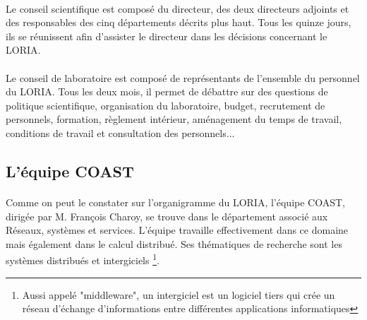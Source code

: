 \documentclass[12pt]{article}
\begin{document}
\paragraph{}
Le conseil scientifique est composé du directeur, des deux directeurs adjoints et des responsables des cinq départements décrits plus haut. Tous les quinze jours, ils se réunissent afin d'assister le directeur dans les décisions concernant le LORIA.
\paragraph{}
Le conseil de laboratoire est composé de représentants de l'ensemble du personnel du LORIA. Tous les deux mois, il permet de débattre sur des questions de  politique scientifique, organisation du laboratoire, budget, recrutement de personnels, formation, règlement intérieur, aménagement du temps de travail, conditions de travail et consultation des personnels...



\subsection{L'équipe COAST}
\paragraph{}
Comme on peut le constater sur l'organigramme du LORIA, l'équipe COAST, dirigée par M. François Charoy, se trouve dans le département associé aux Réseaux, systèmes et services. L'équipe travaille effectivement dans ce domaine mais également dans le calcul distribué. Ses thématiques de recherche sont les systèmes distribués et intergiciels \footnote{Aussi appelé "middleware", un intergiciel est un logiciel tiers qui crée un réseau d'échange d'informations entre différentes applications informatiques}.
\end{document}
